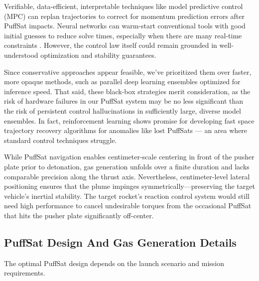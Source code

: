 \documentclass{article}
\begin{document}
Verifiable, data-efficient, interpretable techniques like model predictive control (MPC) can replan trajectories to correct for momentum prediction errors after PuffSat impacts.  Neural networks can  warm-start conventional tools with good initial guesses to reduce solve times, \cite{guffanti2024transformerstrajectoryoptimizationapplication} especially when there are many real-time constraints  \cite{briden_constraint}.  However, the control law itself could remain grounded in well-understood optimization and stability guarantees.     

Since conservative approaches appear feasible, we've prioritized them over faster, more opaque methods, such as parallel deep learning ensembles optimized for inference speed. That said, these black-box strategies merit consideration, as the risk of hardware failures in our PuffSat system may be no less significant than the risk of persistent control hallucinations in sufficiently large, diverse model ensembles.  In fact, reinforcement learning shows promise for developing fast space trajectory recovery algorithms for anomalies like lost PuffSats \cite{zavoli2021reinforcement} --- an area where standard control techniques struggle.  

While PuffSat navigation enables centimeter-scale centering in front of the pusher plate prior to detonation, gas generation unfolds over a finite duration and lacks comparable precision along the thrust axis. Nevertheless, centimeter-level lateral positioning ensures that the plume impinges symmetrically---preserving the target vehicle’s inertial stability.  The target rocket's reaction control system would still need high performance to cancel undesirable torques from the occasional PuffSat that hits the pusher plate significantly off-center.

\subsection{PuffSat Design And Gas Generation Details}\label{sec:puffsat_design}
The optimal PuffSat design depends on the launch scenario and mission requirements.  
\end{document}
